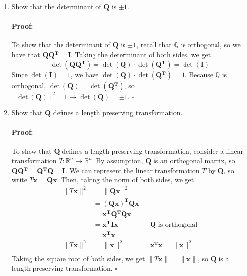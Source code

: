 \documentclass [11pt] {article}
\newcommand{\R}{\mathbb{R}}
\newcommand{\Q}{\mathbb{Q}}
\newcommand{\T}{\bf{T}}
\newcommand{\x}{\bf{x}}
\newcommand{\QT}{\bf{Q$^{\bf{T}}$}}
\newcommand{\QQ}{\bf{Q}}
\newenvironment{proof}{\vspace{-10pt}\paragraph{Proof:}}{\hfill$\square$}
\renewcommand{\bf}[1]{\textbf{{#1}}}
\begin{document}
\begin{enumerate}
\begin{enumerate}
\begin{enumerate}[itemsep=10pt]
                    \item Show that the determinant of $\QQ$ is $\pm 1$.
                        \begin{proof}
                            To show that the determinant of $\QQ$ is $\pm 1$, recall that $\Q$ is 
                            orthogonal, so we have that $\QQ \QT = \bf{I}$. Taking the determinant of 
                            both sides, we get
                            \[\det \left( \QQ \QT \right) = \det \left( \QQ \right) \cdot 
                            \det \left( \QT \right) = \det \left( \bf{I} \right)\]
                            Since $\det \left( \bf{I} \right) = 1$, we have
                            $\det \left( \QQ \right) \cdot \det \left( \QT \right) = 1$. Because $\Q$
                            is orthogonal, $\det \left( \QQ \right) = \det \left( \QT \right)$, so
                            $\left[ \det \left( \QQ \right) \right]^2 = 1 \to \det \left( \QQ \right) = \pm 1$.
                        \end{proof}

                    \item Show that $\QQ$ defines a length preserving transformation.
                        \begin{proof}
                            To show that $\QQ$ defines a length preserving transformation, consider
                            a linear transformation $T : \R^n \to \R^n$. By assumption, $\QQ$ is an
                            orthogonal matrix, so $\QQ \QT = \QT \QQ = \bf{I}$. We can represent
                            the linear transformation $T$ by \QQ, so write $T \x = \QQ \x$. Then, 
                            taking the norm of both sides, we get
                            \begin{align*}
                                \|T \x\|^2 &= \|\QQ \x\|^2 \\
                                           &= \left( \QQ \x \right)^{\T} \QQ \x \\
                                           &= \x^{\T} \QT  \QQ \x \\ 
                                           &= \x^{\T} \bf{I} \x && \text{$\QQ$ is orthogonal} \\ 
                                           &= \x^{\T} \x \\ 
                                \|T \x\|^2 &= \|\x\|^2 && \x^{\T} \x = \|\x\|^2 \\
                            \end{align*}
                            Taking the square root of both sides, we get $\|T \x\| = \|\x\|$, so $\QQ$
                            is a length preserving transformation.
                        \end{proof}
                \end{enumerate}


\end{enumerate}
\end{enumerate}
\end{document}

